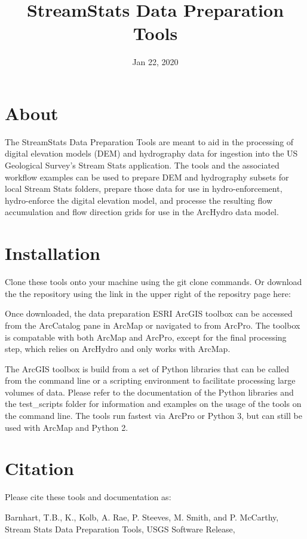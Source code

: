 \documentclass[letterpaper,10pt,english]{sphinxmanual}
\title{StreamStats Data Preparation Tools}
\date{Jan 22, 2020}
\author{}
\begin{document}
\pagestyle{empty}
\sphinxmaketitle
\pagestyle{plain}
\sphinxtableofcontents
\pagestyle{normal}
\label{\detokenize{index::doc}}



\chapter{About}
\label{\detokenize{index:about}}
The StreamStats Data Preparation Tools are meant to aid in the processing of digital elevation models (DEM) and hydrography data for ingestion into the US Geological Survey’s Stream Stats application. The tools and the associated workflow examples can be used to prepare DEM and hydrography subsets for local Stream Stats folders, prepare those data for use in hydro-enforcement, hydro-enforce the digital elevation model, and processe the resulting flow accumulation and flow direction grids for use in the ArcHydro data model.


\chapter{Installation}
\label{\detokenize{index:installation}}
Clone these tools onto your machine using the git clone commands. Or download the the repository using the link in the upper right of the repositry page here: 

Once downloaded, the data preparation ESRI ArcGIS toolbox can be accessed from the ArcCatalog pane in ArcMap or navigated to from ArcPro. The toolbox is compatable with both ArcMap and ArcPro, except for the final processing step, which relies on ArcHydro and only works with ArcMap.

The ArcGIS toolbox is build from a set of Python libraries that can be called from the command line or a scripting environment to facilitate processing large volumes of data. Please refer to the documentation of the Python libraries and the test\_scripts folder for information and examples on the usage of the tools on the command line. The tools run fastest via ArcPro or Python 3, but can still be used with ArcMap and Python 2.


\chapter{Citation}
\label{\detokenize{index:citation}}
Please cite these tools and documentation as:

Barnhart, T.B., K., Kolb, A. Rae, P. Steeves, M. Smith, and P. McCarthy, Stream Stats Data Preparation Tools, USGS Software Release, 
\end{document}

